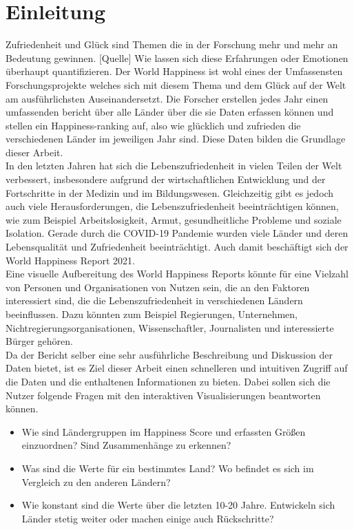 \section{Einleitung}

Zufriedenheit und Glück sind Themen die in der Forschung mehr und mehr an Bedeutung gewinnen. [Quelle]
Wie lassen sich diese Erfahrungen oder Emotionen überhaupt quantifizieren. Der World Happiness ist wohl eines der Umfassensten Forschungsprojekte welches sich mit diesem Thema und dem Glück auf der Welt am ausführlichsten Auseinandersetzt. Die Forscher erstellen jedes Jahr einen umfassenden bericht über alle Länder über die sie Daten erfassen können und stellen ein Happiness-ranking auf, also wie glücklich und zufrieden die verschiedenen Länder im jeweiligen Jahr sind. Diese Daten bilden die Grundlage dieser Arbeit. \\

In den letzten Jahren hat sich die Lebenszufriedenheit in vielen Teilen der Welt verbessert, insbesondere aufgrund der wirtschaftlichen Entwicklung und der Fortschritte in der Medizin und im Bildungswesen. Gleichzeitig gibt es jedoch auch viele Herausforderungen, die Lebenszufriedenheit beeinträchtigen können, wie zum Beispiel Arbeitslosigkeit, Armut, gesundheitliche Probleme und soziale Isolation. Gerade durch die COVID-19 Pandemie wurden viele Länder und deren Lebensqualität und Zufriedenheit beeinträchtigt. Auch damit beschäftigt sich der World Happiness Report 2021. \cite{helliwell_world_2021} \\

Eine visuelle Aufbereitung des World Happiness Reports könnte für eine Vielzahl von Personen und Organisationen von Nutzen sein, die an den Faktoren interessiert sind, die die Lebenszufriedenheit in verschiedenen Ländern beeinflussen. Dazu könnten zum Beispiel Regierungen, Unternehmen, Nichtregierungsorganisationen, Wissenschaftler, Journalisten und interessierte Bürger gehören. \\

Da der Bericht selber eine sehr ausführliche Beschreibung und Diskussion der Daten bietet, ist es Ziel dieser Arbeit einen schnelleren und intuitiven Zugriff auf die Daten und die enthaltenen Informationen zu bieten. Dabei sollen sich die Nutzer folgende Fragen mit den interaktiven Visualisierungen beantworten können. \\

\begin{itemize}
    \item Wie sind Ländergruppen im Happiness Score und erfassten Größen einzuordnen? Sind Zusammenhänge zu erkennen? 
    \item Was sind die Werte für ein bestimmtes Land? Wo befindet es sich im Vergleich zu den anderen Ländern? 
    \item Wie konstant sind die Werte über die letzten 10-20 Jahre. Entwickeln sich Länder stetig weiter oder machen einige auch Rückschritte?
\end{itemize}

